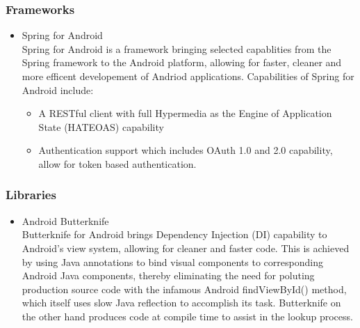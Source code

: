 \documentclass[a4paper,10pt]{article}
\begin{document}
\subsubsection{Frameworks}
	\begin{itemize}
		\item Spring for Android\\
		Spring for Android is a framework bringing selected capablities from the Spring framework to the Android platform, allowing for faster, cleaner and more efficent developement of Andriod applications. Capabilities of Spring for Android include:
		\begin{itemize}
			\item A RESTful client with full Hypermedia as the Engine of Application State (HATEOAS) capability
			\item Authentication support which includes OAuth 1.0 and 2.0 capability, allow for token based authentication.
		\end{itemize}
	\end{itemize}

\subsubsection{Libraries}
	\begin{itemize}
		\item Android Butterknife\\
		Butterknife for Android brings Dependency Injection (DI) capability to Android's view system, allowing for cleaner and faster code. This is achieved by using Java annotations to bind visual components to corresponding Android Java components, thereby eliminating the need for poluting production source code with the infamous Android findViewById() method, which itself uses slow Java reflection to accomplish its task. Butterknife on the other hand produces code at compile time to assist in the lookup process.
	\end{itemize}
\end{document}

